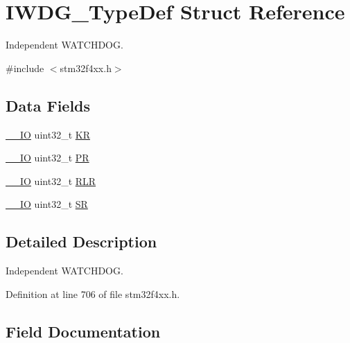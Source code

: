 \hypertarget{struct_i_w_d_g___type_def}{}\section{I\+W\+D\+G\+\_\+\+Type\+Def Struct Reference}
\label{struct_i_w_d_g___type_def}


Independent W\+A\+T\+C\+H\+D\+OG.  




{\ttfamily \#include $<$stm32f4xx.\+h$>$}

\subsection*{Data Fields}
\begin{DoxyCompactItemize}
\item 
\hyperlink{group___c_m_s_i_s__core__definitions_gaec43007d9998a0a0e01faede4133d6be}{\+\_\+\+\_\+\+IO} uint32\+\_\+t \hyperlink{struct_i_w_d_g___type_def_a2f692354bde770f2a5e3e1b294ec064b}{KR}
\item 
\hyperlink{group___c_m_s_i_s__core__definitions_gaec43007d9998a0a0e01faede4133d6be}{\+\_\+\+\_\+\+IO} uint32\+\_\+t \hyperlink{struct_i_w_d_g___type_def_af8d25514079514d38c104402f46470af}{PR}
\item 
\hyperlink{group___c_m_s_i_s__core__definitions_gaec43007d9998a0a0e01faede4133d6be}{\+\_\+\+\_\+\+IO} uint32\+\_\+t \hyperlink{struct_i_w_d_g___type_def_a7015e1046dbd3ea8783b33dc11a69e52}{R\+LR}
\item 
\hyperlink{group___c_m_s_i_s__core__definitions_gaec43007d9998a0a0e01faede4133d6be}{\+\_\+\+\_\+\+IO} uint32\+\_\+t \hyperlink{struct_i_w_d_g___type_def_af6aca2bbd40c0fb6df7c3aebe224a360}{SR}
\end{DoxyCompactItemize}


\subsection{Detailed Description}
Independent W\+A\+T\+C\+H\+D\+OG. 

Definition at line 706 of file stm32f4xx.\+h.



\subsection{Field Documentation}
\mbox{\label{struct_i_w_d_g___type_def_a2f692354bde770f2a5e3e1b294ec064b}} 
